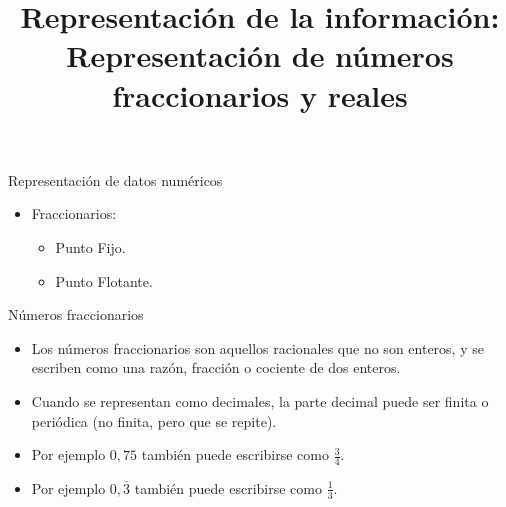 \documentclass[11pt,a4paper,spanish]{beamer}
\title{Representación de la información:\\
Representación de números fraccionarios y reales}
\author{}
\date{}
\begin{document}
\begin{frame}[noframenumbering]
    \maketitle
    \centering
\end{frame}

\begin{frame}[label=temario]{Representación de datos numéricos}
\begin{itemize}
\item Fraccionarios:
    \begin{itemize}
        \item Punto Fijo.
        \item Punto Flotante.
    \end{itemize}
\end{itemize}
\end{frame}

\begin{frame}{Números fraccionarios}
\begin{itemize}
    \item Los números fraccionarios son aquellos racionales que no son
        enteros, y se escriben como una razón, fracción o cociente de dos
        enteros.
    \item Cuando se representan como decimales, la parte decimal puede ser
        finita o periódica (no finita, pero que se repite).\pause
    \item Por ejemplo $0,75$ también puede escribirse como $\frac{3}{4}$.
    \item Por ejemplo $0,\overline{3}$ también puede escribirse como
        $\frac{1}{3}$.
\end{itemize}
\end{frame}
\end{document}
